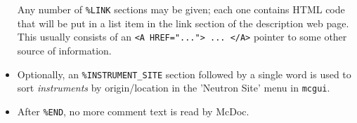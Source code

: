 \begin{itemize}
  Any number of \verb+%LINK+
  sections may be given; each one contains HTML code that will be put in
  a list item in the link section of the description web page. This
  usually consists of an \verb+<A HREF="..."> ... </A>+ pointer to some
  other source of information.
\item
  Optionally, an \verb+%INSTRUMENT_SITE+ section followed by a single word is used to sort \emph{instruments} by origin/location in the 'Neutron Site' menu in \verb+mcgui+.
\item  {}
  After \verb+%END+, no more comment text is read by McDoc.
\end{itemize}

